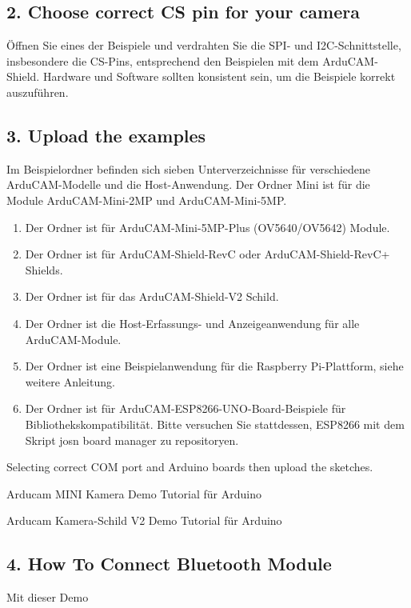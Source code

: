 \subsection{2. Choose correct CS pin for your camera}

Öffnen Sie eines der Beispiele und verdrahten Sie die SPI- und I2C-Schnittstelle, insbesondere die CS-Pins, entsprechend den Beispielen mit dem ArduCAM-Shield. Hardware und Software sollten konsistent sein, um die Beispiele korrekt auszuführen.

\subsection{3. Upload the examples}


Im Beispielordner befinden sich sieben Unterverzeichnisse für verschiedene ArduCAM-Modelle und die Host-Anwendung. Der Ordner Mini ist für die Module ArduCAM-Mini-2MP und ArduCAM-Mini-5MP.

\begin{enumerate}
  \item Der Ordner  ist für ArduCAM-Mini-5MP-Plus (OV5640/OV5642) Module.
  \item Der Ordner  ist für ArduCAM-Shield-RevC oder ArduCAM-Shield-RevC+ Shields.
  \item Der Ordner  ist für das ArduCAM-Shield-V2 Schild.
  \item Der Ordner  ist die Host-Erfassungs- und Anzeigeanwendung für alle ArduCAM-Module.
  \item Der Ordner  ist eine Beispielanwendung für die Raspberry Pi-Plattform, siehe weitere Anleitung.
  \item Der Ordner  ist für ArduCAM-ESP8266-UNO-Board-Beispiele für Bibliothekskompatibilität. Bitte versuchen Sie stattdessen, ESP8266 mit dem Skript josn board manager zu repositoryen.
\end{enumerate}


Selecting correct COM port and Arduino boards then upload the sketches.

\bigskip

     
Arducam MINI Kamera Demo Tutorial für Arduino

Arducam Kamera-Schild V2 Demo Tutorial für Arduino

\subsection{4. How To Connect Bluetooth Module}
Mit dieser Demo

